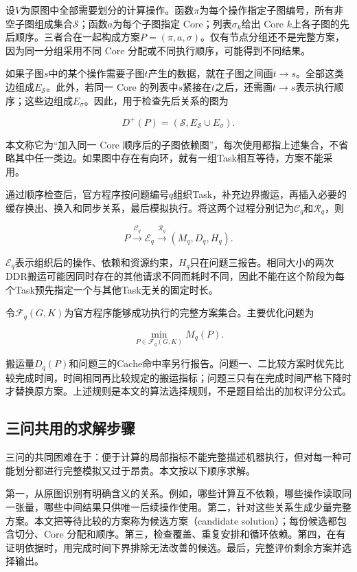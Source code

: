 \documentclass[anonymous,notoc]{gmcm2026}
\begin{document}
设\(V\)为原图中全部需要划分的计算操作。函数\(\pi\)为每个操作指定子图编号，所有非空子图组成集合\(\mathcal S\)；函数\(a\)为每个子图指定 Core；列表\(\sigma_k\)给出 Core \(k\)上各子图的先后顺序。三者合在一起构成方案\(P=(\pi,a,\sigma)\)。仅有节点分组还不是完整方案，因为同一分组采用不同 Core 分配或不同执行顺序，可能得到不同结果。

如果子图\(s\)中的某个操作需要子图\(t\)产生的数据，就在子图之间画\(t\to s\)。全部这类边组成\(E_{\mathcal S}\)。此外，若同一 Core 的列表中\(s\)紧接在\(t\)之后，还需画\(t\to s\)表示执行顺序；这些边组成\(E_\sigma\)。因此，用于检查先后关系的图为

\[D^+(P)=(\mathcal S,E_{\mathcal S}\cup E_\sigma).\]

本文称它为``加入同一 Core 顺序后的子图依赖图''，每次使用都指上述集合，不省略其中任一类边。如果图中存在有向环，就有一组Task相互等待，方案不能采用。

通过顺序检查后，官方程序按问题编号\(q\)组织Task，补充边界搬运，再插入必要的缓存换出、换入和同步关系，最后模拟执行。将这两个过程分别记为\(\mathcal C_q\)和\(\mathcal R_q\)，则

\[P\xrightarrow{\mathcal C_q}\mathcal E_q\xrightarrow{\mathcal R_q}(M_q,D_q,H_q).\]

\(\mathcal E_q\)表示组织后的操作、依赖和资源约束，\(H_q\)只在问题三报告。相同大小的两次DDR搬运可能因同时存在的其他请求不同而耗时不同，因此不能在这个阶段为每个Task预先指定一个与其他Task无关的固定时长。

令\(\mathcal F_q(G,K)\)为官方程序能够成功执行的完整方案集合。主要优化问题为

\[\min_{P\in\mathcal F_q(G,K)}M_q(P).\]

搬运量\(D_q(P)\)和问题三的Cache命中率另行报告。问题一、二比较方案时优先比较完成时间，时间相同再比较规定的搬运指标；问题三只有在完成时间严格下降时才替换原方案。上述规则是本文的算法选择规则，不是题目给出的加权评分公式。

\subsection{三问共用的求解步骤}

三问的共同困难在于：便于计算的局部指标不能完整描述机器执行，但对每一种可能划分都进行完整模拟又过于昂贵。本文按以下顺序求解。

第一，从原图识别有明确含义的关系。例如，哪些计算互不依赖，哪些操作读取同一张量，哪些中间结果只供唯一后续操作使用。第二，针对这些关系生成少量完整方案。本文把等待比较的方案称为候选方案（candidate solution）；每份候选都包含切分、Core 分配和顺序。第三，检查覆盖、重复安排和循环依赖。第四，在有证明依据时，用完成时间下界排除无法改善的候选。最后，完整评价剩余方案并选择输出。
\end{document}
